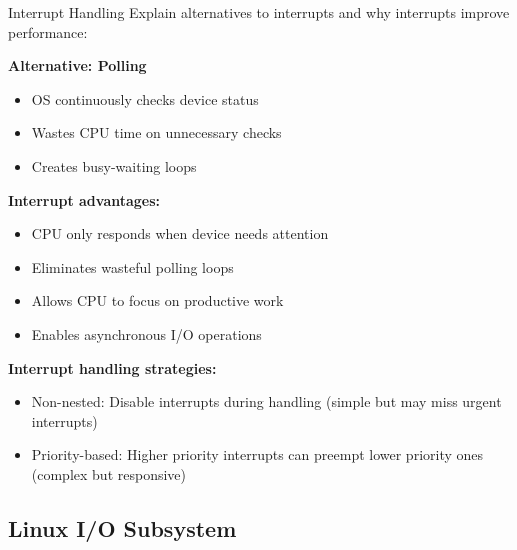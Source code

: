 \begin{example2}{Interrupt Handling}
    Explain alternatives to interrupts and why interrupts improve performance:
    
    \tcblower
    
    \textbf{Alternative: Polling}
    \begin{itemize}
        \item OS continuously checks device status
        \item Wastes CPU time on unnecessary checks
        \item Creates busy-waiting loops
    \end{itemize}
    
    \textbf{Interrupt advantages:}
    \begin{itemize}
        \item CPU only responds when device needs attention
        \item Eliminates wasteful polling loops
        \item Allows CPU to focus on productive work
        \item Enables asynchronous I/O operations
    \end{itemize}
    
    \textbf{Interrupt handling strategies:}
    \begin{itemize}
        \item Non-nested: Disable interrupts during handling (simple but may miss urgent interrupts)
        \item Priority-based: Higher priority interrupts can preempt lower priority ones (complex but responsive)
    \end{itemize}
\end{example2}

\raggedcolumns
\pagebreak

\subsection{Linux I/O Subsystem}



